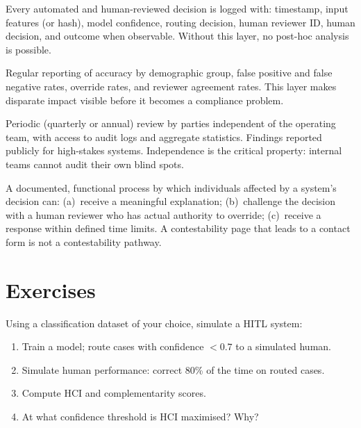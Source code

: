\begin{keyconcept}
Every automated and human-reviewed decision is logged with: timestamp, input features (or hash), model confidence, routing decision, human reviewer ID, human decision, and outcome when observable. Without this layer, no post-hoc analysis is possible.
\end{keyconcept}

\begin{keyconcept}
Regular reporting of accuracy by demographic group, false positive and false negative rates, override rates, and reviewer agreement rates. This layer makes disparate impact visible before it becomes a compliance problem.
\end{keyconcept}

\begin{keyconcept}
Periodic (quarterly or annual) review by parties independent of the operating team, with access to audit logs and aggregate statistics. Findings reported publicly for high-stakes systems. Independence is the critical property: internal teams cannot audit their own blind spots.
\end{keyconcept}

\begin{keyconcept}
A documented, functional process by which individuals affected by a system's decision can: (a)~receive a meaningful explanation; (b)~challenge the decision with a human reviewer who has actual authority to override; (c)~receive a response within defined time limits. A contestability page that leads to a contact form is not a contestability pathway.
\end{keyconcept}

\section{Exercises}

\begin{Exercise}
Using a classification dataset of your choice, simulate a HITL system:
\begin{enumerate}
    \item Train a model; route cases with confidence $< 0.7$ to a simulated human.
    \item Simulate human performance: correct 80\% of the time on routed cases.
    \item Compute HCI and complementarity scores.
    \item At what confidence threshold is HCI maximised? Why?
\end{enumerate}
\end{Exercise}

